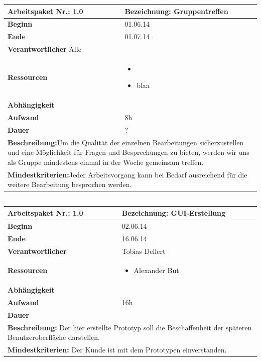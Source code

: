\documentclass[fontsize=12pt,paper=a4,twoside]{scrartcl}
\begin{document}
\begin{tabular}{|p{5.3cm}|p{9.7cm}|}\hline
	\textbf{Arbeitspaket Nr.:} 1.0 & \textbf{Bezeichnung:} Gruppentreffen\\ \hline \hline
	\textbf{Beginn} & 01.06.14\\ \hline
	\textbf{Ende} &  01.07.14\\ \hline
	\textbf{Verantwortlicher} Alle \\ \hline
	\textbf{Ressourcen} & \begin{itemize}
		\item 
		\item blaa
	\end{itemize}    \\ \hline
	\textbf{Abhängigkeit} &\\ \hline
	\textbf{Aufwand} & 8h\\ \hline
	\textbf{Dauer} & ?\\ \hline
	\multicolumn{2}{|p{15cm}|}{\textbf{Beschreibung:}\newline  Um die Qualität der einzelnen Bearbeitungen sicherzustellen und eine Möglichkeit für Fragen und Besprechungen zu bieten, werden wir uns als Gruppe mindestens einmal in der Woche gemeinsam treffen. }\\ \hline
	\multicolumn{2}{|p{15cm}|}{\textbf{Mindestkriterien:}\newline Jeder Arbeitsvorgang kann bei Bedarf ausreichend für die weitere Bearbeitung besprochen werden. }\\ \hline
\end{tabular}

\begin{verbatim} 
\end{verbatim}

\begin{tabular}{|p{5.3cm}|p{9.7cm}|}\hline
	\textbf{Arbeitspaket Nr.:} 1.0 & \textbf{Bezeichnung:} GUI-Erstellung\\ \hline \hline
	\textbf{Beginn} & 02.06.14\\ \hline
	\textbf{Ende} & 16.06.14\\ \hline
	\textbf{Verantwortlicher} & Tobias Dellert\\ \hline
	\textbf{Ressourcen} & \begin{itemize}
		\item Alexander But
	\end{itemize}    \\ \hline
	\textbf{Abhängigkeit} &\\ \hline
	\textbf{Aufwand} & 16h\\ \hline
	\textbf{Dauer} & \\ \hline
	\multicolumn{2}{|p{15cm}|}{\textbf{Beschreibung:} Der hier erstellte Prototyp soll die Beschaffenheit der späteren Benutzeroberfläche darstellen. \newline   }\\ \hline
	\multicolumn{2}{|p{15cm}|}{\textbf{Mindestkriterien:} Der Kunde ist mit dem Prototypen einverstanden.\newline }\\ \hline
\end{tabular}
\end{document}
